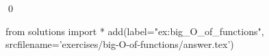\begin{ex}
  \label{ex:big_O_of_functions}
  
  \qed
\end{ex}
\begin{python0}
from solutions import *
add(label="ex:big_O_of_functions",
    srcfilename='exercises/big-O-of-functions/answer.tex') 
\end{python0}                              
